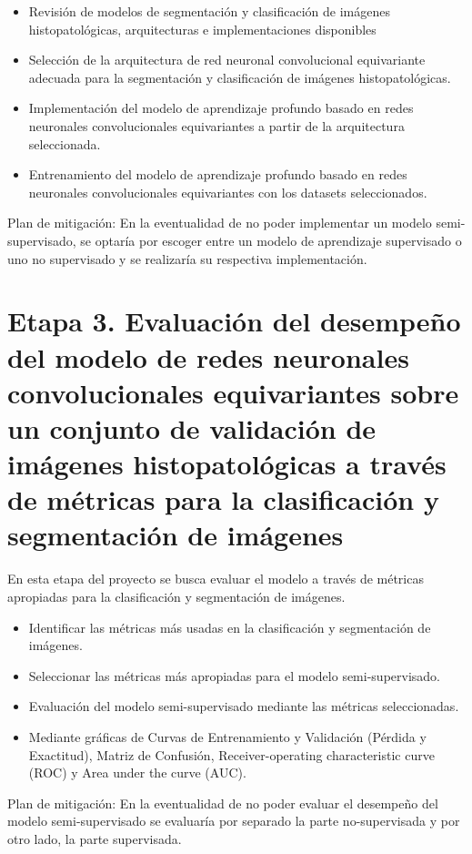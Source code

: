 \documentclass[12pt,letterpaper,final, openany]{scrbook}
\begin{document}
\begin{itemize}
    \item Revisión de modelos de segmentación y clasificación de imágenes histopatológicas, arquitecturas e implementaciones disponibles
    \item Selección de la arquitectura de red neuronal convolucional equivariante adecuada para la segmentación y clasificación de imágenes histopatológicas.
    \item Implementación del modelo de aprendizaje profundo basado en redes neuronales convolucionales equivariantes a partir de la arquitectura seleccionada.
    \item Entrenamiento del modelo de aprendizaje profundo basado en redes neuronales convolucionales equivariantes con los datasets seleccionados.
\end{itemize}

Plan de mitigación: En la eventualidad de no poder implementar un modelo semi-supervisado, se optaría por escoger entre un modelo de aprendizaje supervisado o uno no supervisado y se realizaría su respectiva implementación.


\section{Etapa 3. Evaluación del desempeño del modelo de redes neuronales convolucionales equivariantes sobre un conjunto de validación de imágenes histopatológicas a través de métricas para la clasificación y segmentación de imágenes}

En esta etapa del proyecto se busca evaluar el modelo a través de métricas apropiadas para la clasificación y segmentación de imágenes.

\begin{itemize}
    \item Identificar las métricas más usadas en la clasificación y segmentación de imágenes.
    \item Seleccionar las métricas más apropiadas para el modelo semi-supervisado.
    \item Evaluación del modelo semi-supervisado mediante las métricas seleccionadas.
    \item Mediante gráficas de Curvas de Entrenamiento y Validación (Pérdida y Exactitud), Matriz de Confusión, Receiver-operating characteristic curve (ROC) y Area under the curve (AUC).
\end{itemize}

Plan de mitigación: En la eventualidad de no poder evaluar el desempeño del modelo semi-supervisado se evaluaría por separado la parte no-supervisada y por otro lado, la parte supervisada.
\end{document}
